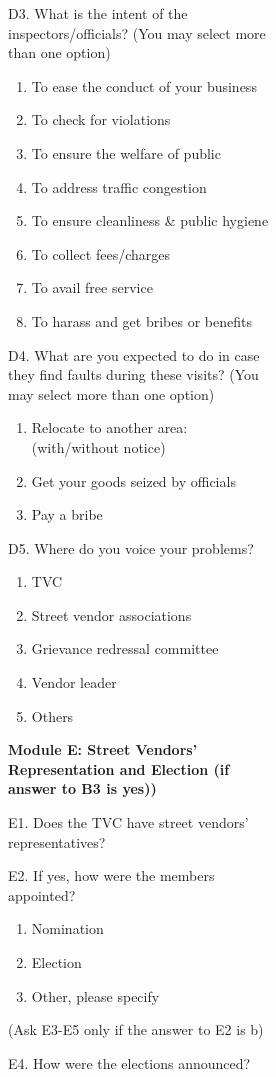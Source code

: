 \documentclass[a4paper, 12pt, twoside]{article}
\begin{document}
\begin{figure}
{\begin{figure}
\begin{figure}
\begin{mdframed}[backgroundcolor=gray!20]
D3. What is the intent of the inspectors/officials? (You may select more than one option)
\begin{enumerate}[nosep]
\item To ease the conduct of your business
\item To check for violations
\item To ensure the welfare of public
\item To address traffic congestion
\item To ensure cleanliness \& public hygiene
\item To collect fees/charges
\item To avail free service
\item To harass and get bribes or benefits
\end{enumerate}

D4. What are you expected to do in case they find faults during these visits? (You may select more than one option)
\begin{enumerate}[nosep]
\item Relocate to another area: (with/without notice)
\item Get your goods seized by officials
\item Pay a bribe
\end{enumerate}

D5. Where do you voice your problems?
\begin{enumerate}[nosep]
\item TVC
\item Street vendor associations
\item Grievance redressal committee
\item Vendor leader
\item Others
\end{enumerate}

\textbf{Module E: Street Vendors’ Representation and Election (if answer to B3 is yes))}

E1. Does the TVC have street vendors’ representatives?

E2. If yes, how were the members appointed?
\begin{enumerate}[nosep]
\item Nomination
\item Election
\item Other, please specify
\end{enumerate}

(Ask E3-E5 only if the answer to E2 is b)


E4. How were the elections announced?


\end{mdframed}
\end{figure}
\end{figure}}
\end{figure}
\end{document}
